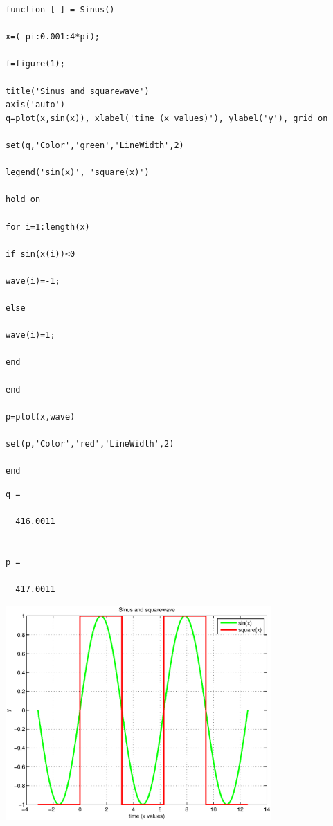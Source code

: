 \documentclass{article}
\begin{document}
    
    \begin{verbatim}
function [ ] = Sinus()

x=(-pi:0.001:4*pi);

f=figure(1);

title('Sinus and squarewave')
axis('auto')
q=plot(x,sin(x)), xlabel('time (x values)'), ylabel('y'), grid on

set(q,'Color','green','LineWidth',2)

legend('sin(x)', 'square(x)')

hold on

for i=1:length(x)

if sin(x(i))<0

wave(i)=-1;

else

wave(i)=1;

end

end

p=plot(x,wave)

set(p,'Color','red','LineWidth',2)

end
\end{verbatim}

        \color{lightgray} \begin{verbatim}
q =

  416.0011


p =

  417.0011

\end{verbatim} \color{black}
    
\includegraphics [width=4in]{Sinus_01.eps}
\end{document}
